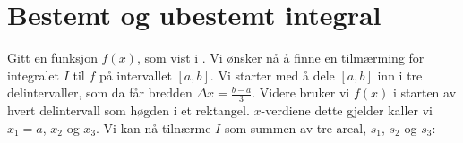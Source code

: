 




\section{Bestemt og ubestemt integral \label{BestemtogubestemtI}}
\vsk

Gitt en funksjon $ f(x) $, som vist i . Vi ønsker nå å finne  en tilmærming for integralet $ I $ til $ f $ på intervallet $ [a, b] $.
Vi starter med å dele $ [a, b] $ inn i tre delintervaller, som da får bredden $ \Delta x=\frac{b-a}{3} $. Videre bruker vi $ f(x) $ i starten av hvert delintervall som høgden i et rektangel. $ x $-verdiene dette gjelder kaller vi $ {x_1=a} $, $ x_2 $ og $ x_3 $. Vi kan nå tilnærme $ I $ som summen av tre areal, $ s_1 $, $ s_2 $ og $ s_3 $:

